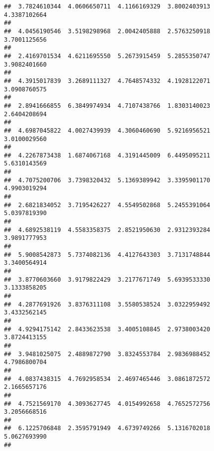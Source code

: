 \documentclass[]{article}
\begin{document}
\begin{verbatim}
##  3.7824610344  4.0606650711  4.1166169329  3.8002403913  4.3387102664 
##                                                                       
##  4.0456190546  3.5198298968  2.0042405888  2.5763250918  3.7001125656 
##                                                                       
##  2.4169701534  4.6211695550  5.2673915459  5.2855350747  3.9082401660 
##                                                                       
##  4.3915017839  3.2689111327  4.7648574332  4.1928122071  3.0908760575 
##                                                                       
##  2.8941666855  6.3849974934  4.7107438766  1.8303140023  2.6404208694 
##                                                                       
##  4.6987045822  4.0027439939  4.3060460690  5.9216956521  3.0100029560 
##                                                                       
##  4.2267873438  1.6874067168  4.3191445009  6.4495095211  5.6310143569 
##                                                                       
##  4.7075200706  3.7398320432  5.1369389942  3.3395901170  4.9903019294 
##                                                                       
##  2.6821834052  3.7195426227  4.5549502868  5.2455391064  5.0397819390 
##                                                                       
##  4.6892538119  4.5583358375  2.8521950630  2.9312393284  3.9891777953 
##                                                                       
##  5.9008542873  5.7374082136  4.4127643303  3.7131748844  3.3400564914 
##                                                                       
##  3.8770603660  3.9179822429  3.2177671749  5.6939533330  3.1333858205 
##                                                                       
##  4.2877691926  3.8376311108  3.5580538524  3.0322959492  3.4332562145 
##                                                                       
##  4.9294175142  2.8433623538  3.4005108845  2.9738003420  3.8724413155 
##                                                                       
##  3.9481025075  2.4889872790  3.8324553784  2.9836988452  4.7986800704 
##                                                                       
##  4.0837438315  4.7692958534  2.4697465446  3.0861872572  2.1665657176 
##                                                                       
##  4.7521569170  4.3093627745  4.0154992658  4.7652572756  3.2056668516 
##                                                                       
##  6.1225706848  2.3595791949  4.6739749266  5.1316702018  5.0627693990 
##                                                                       

\end{verbatim}
\end{document}
